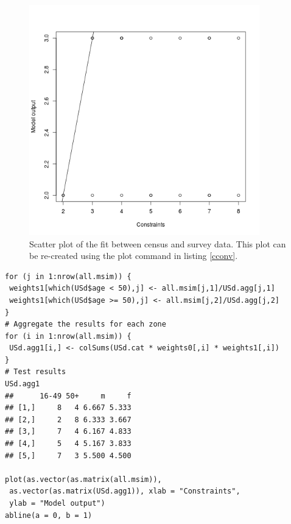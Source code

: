 \documentclass[a4paper, 11pt, twoside]{article}
\begin{document}
\begin{figure}[h]
 \begin{center}
   \includegraphics[width = 10cm]{unnamed-chunk-5}
 \end{center}
\caption[Scatter plot of the fit between census and survey data]
{Scatter plot of the fit between census and survey data. This plot
can be re-created using the plot command in listing \ref{cconv}.}
 \label{fct1}
\end{figure}

\begin{lstlisting}[float=h, caption={Reweighting of first constraint
and testing of results}, label=ccon1]
for (j in 1:nrow(all.msim)) {
 weights1[which(USd$age < 50),j] <- all.msim[j,1]/USd.agg[j,1]
 weights1[which(USd$age >= 50),j] <- all.msim[j,2]/USd.agg[j,2]
}
# Aggregate the results for each zone
for (i in 1:nrow(all.msim)) {
 USd.agg1[i,] <- colSums(USd.cat * weights0[,i] * weights1[,i])
}
# Test results
USd.agg1
##      16-49 50+     m     f
## [1,]     8   4 6.667 5.333
## [2,]     2   8 6.333 3.667
## [3,]     7   4 6.167 4.833
## [4,]     5   4 5.167 3.833
## [5,]     7   3 5.500 4.500

plot(as.vector(as.matrix(all.msim)),
 as.vector(as.matrix(USd.agg1)), xlab = "Constraints",
 ylab = "Model output")
abline(a = 0, b = 1)
\end{lstlisting}
\end{document}

